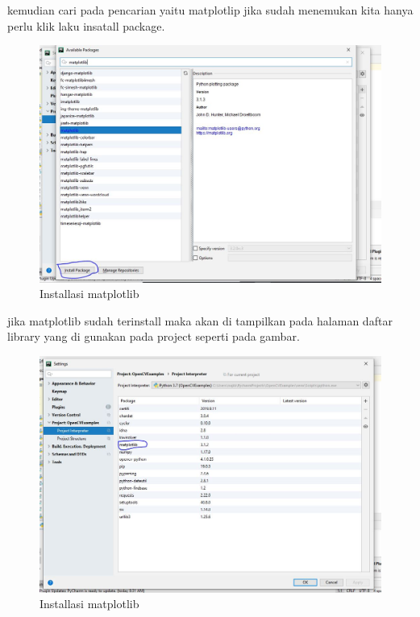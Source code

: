 \newpage
kemudian cari pada pencarian yaitu matplotlip jika sudah menemukan kita hanya perlu klik laku insatall package.
\begin{figure}[ht]
\centering
\includegraphics[scale=0.45]{figures/2,46,1.jpg}
\caption{Installasi matplotlib}
\label{contoh}
\end{figure}

\newpage
jika matplotlib sudah terinstall maka akan di tampilkan pada halaman daftar library yang di gunakan pada project seperti pada gambar.
\begin{figure}[ht]
\centering
\includegraphics[scale=0.45]{figures/2,46,2.jpg}
\caption{Installasi matplotlib}
\label{contoh}
\end{figure}





